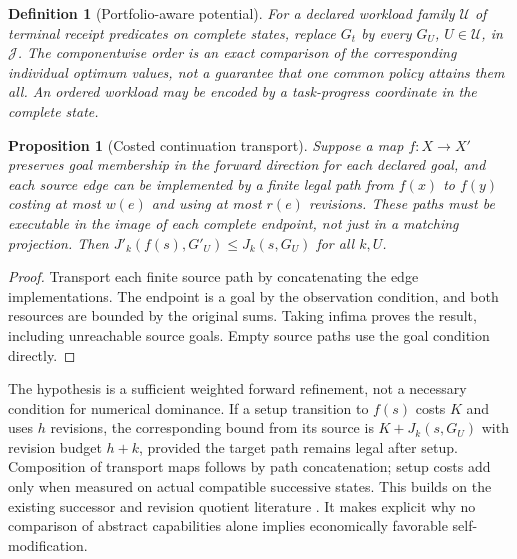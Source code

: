 \documentclass[11pt]{article}
\newtheorem{proposition}[theorem]{Proposition}
\newtheorem{definition}[theorem]{Definition}
\theoremstyle{remark}\newtheorem{remark}[theorem]{Remark}
\newcommand{\J}{\mathcal J}
\begin{document}
\begin{definition}[Portfolio-aware potential]
For a declared workload family $\mathcal U$ of terminal receipt predicates on complete states, replace $G_t$ by every $G_U$, $U\in\mathcal U$, in $\J$. The componentwise order is an exact comparison of the corresponding \emph{individual optimum values}, not a guarantee that one common policy attains them all. An ordered workload may be encoded by a task-progress coordinate in the complete state.
\end{definition}
\begin{proposition}[Costed continuation transport]\label{thm:transport}
Suppose a map $f:X\to X'$ preserves goal membership in the forward direction for each declared goal, and each source edge can be implemented by a finite legal path from $f(x)$ to $f(y)$ costing at most $w(e)$ and using at most $r(e)$ revisions. These paths must be executable in the image of each complete endpoint, not just in a matching projection. Then $J'_k(f(s),G'_U)\le J_k(s,G_U)$ for all $k,U$.
\end{proposition}
\begin{proof}
Transport each finite source path by concatenating the edge implementations. The endpoint is a goal by the observation condition, and both resources are bounded by the original sums. Taking infima proves the result, including unreachable source goals. Empty source paths use the goal condition directly.
\end{proof}
The hypothesis is a sufficient weighted forward refinement, not a necessary condition for numerical dominance. If a setup transition to $f(s)$ costs $K$ and uses $h$ revisions, the corresponding bound from its source is $K+J_k(s,G_U)$ with revision budget $h+k$, provided the target path remains legal after setup. Composition of transport maps follows by path concatenation; setup costs add only when measured on actual compatible successive states. This builds on the existing successor and revision quotient literature \cite{successor,quotients,alur}. It makes explicit why no comparison of abstract capabilities alone implies economically favorable self-modification.
\end{document}

